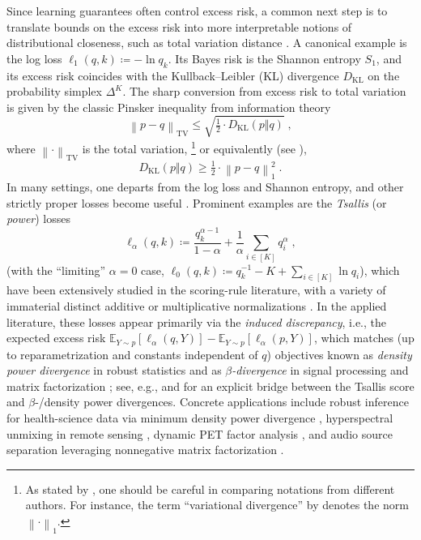 \documentclass[11pt,oneside,a4paper]{article}
\newcommand{\E}{\mathbb{E}}
\newcommand{\lno}[1]{\left\lVert#1\right\rVert}
\theoremstyle{plain}
\theoremstyle{definition}
\theoremstyle{remark}
\newcommand{\simplex}[1]{\Delta^{#1}}
\newcommand{\KL}{D_{\mathrm{KL}}}
\newcommand{\TV}[2]{\lno{ #1 - #2 }_{\textrm{TV}} }
\begin{document}
Since learning guarantees often control excess risk, a common next step is to translate bounds on the excess risk into more interpretable notions of distributional closeness, such as total variation distance \citep{reid2011information,haghtalab2019losses}.
A canonical example is the log loss
$
    \ell_1(q,k)
\coloneqq
    -\ln q_k
$.
Its Bayes risk is the Shannon entropy $S_1$, and its excess risk coincides with the Kullback--Leibler (KL) divergence $\KL$ on the probability simplex $\simplex{K}$.
The sharp conversion from excess risk to total variation is given by the classic Pinsker inequality from information theory \citep{Tsybakov2008}
\[
    \TV{p}{q}
\le
    \sqrt{\tfrac{1}{2}\cdot\KL(p\Vert q)}\;,
\]
where $\lno{\cdot}_{\mathrm{TV}}$ is the total variation,%
    \footnote{As stated by \cite{reid2011information}, one should be careful in comparing notations from different authors. For instance, the term ``variational divergence'' by \cite{reid2011information} denotes the norm $\lno{\cdot}_1$.}
or equivalently (see ),
\[
    \KL(p\Vert q)
\ge
    \tfrac{1}{2}\cdot \lno{p-q}_1^2\;.
\]
In many settings, one departs from the log loss and Shannon entropy, and other strictly proper
losses become useful \citep{Savage1971,LambertPennockShoham2008,giummole2019objective}.
Prominent examples are the \emph{Tsallis} (or \emph{power}) losses
\begin{equation}
\label{eq:tsallis_losses}    
    \ell_\alpha(q,k)
\coloneqq
    \frac{q^{\alpha-1}_k}{1-\alpha}+\frac{1}{\alpha}\sum_{i \in [K]}q_i^\alpha\;,
\end{equation}
(with the ``limiting'' $\alpha = 0$ case, 
$
    \ell_0(q,k)
\coloneqq
    q_k^{-1} -K +\sum_{i \in [K]} \ln q_i
$),
which have been extensively studied in the scoring-rule literature, 
with a variety of immaterial distinct additive or multiplicative normalizations \citep{dawid2007geometry,cichocki_FamiAlphBeta_2010,dawid2014theory,dawid2016minimum,BasuEtal1998DensityPower,kanamori2014,Mameli2015}.
 In the applied literature, these losses appear primarily via the \emph{induced discrepancy}, i.e., the expected excess risk
$\E_{Y\sim p}[\ell_\alpha(q,Y)]-\E_{Y\sim p}[\ell_\alpha(p,Y)]$,
which matches (up to reparametrization and constants independent of $q$) objectives known as \emph{density power divergence} in robust statistics
\citep{BasuEtal1998DensityPower} and as \emph{$\beta$-divergence} in signal processing and matrix factorization
\citep{fevotte2011algorithms}; see, e.g., \cite{dawid2016minimum} and \cite{jewson2018generalBayes}
for an explicit bridge between the Tsallis score and $\beta$-/density power divergences.
Concrete applications include robust inference for health-science data via minimum density power divergence
\citep{nandy2022healthDPD}, hyperspectral unmixing in remote sensing \citep{fevotteDobigeon2015Hyperspectral},
dynamic PET factor analysis \citep{cavalcanti2019PETbeta}, and audio source separation leveraging nonnegative matrix factorization 
\citep{ozerovFevotte2010AudioNMF}.
\end{document}
